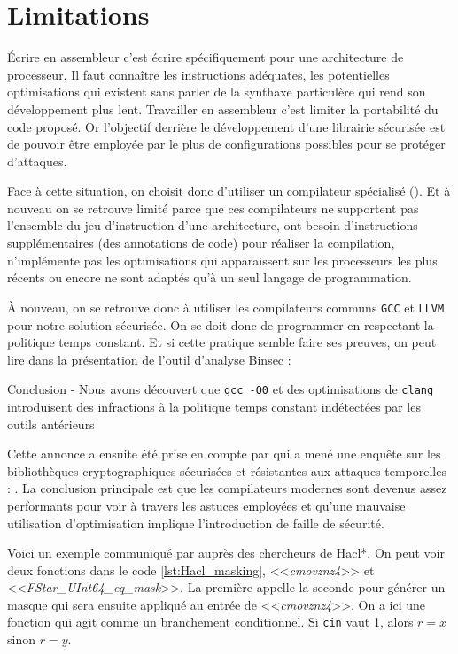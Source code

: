 \section{Limitations}
\label{sect:limitations}

Écrire en assembleur c'est écrire spécifiquement pour une architecture de processeur. Il faut connaître les instructions adéquates, les potentielles optimisations qui existent sans parler de la synthaxe particulère qui rend son développement plus lent. Travailler en assembleur c'est limiter la portabilité du code proposé. Or l'objectif derrière le développement d'une librairie sécurisée est de pouvoir être employée par le plus de configurations possibles pour se protéger d'attaques.\smallbreak

Face à cette situation, on choisit donc d'utiliser un compilateur spécialisé (\cite{Borrello_2021, Raccoon}). Et à nouveau on se retrouve limité parce que ces compilateurs ne supportent pas l'ensemble du jeu d'instruction d'une architecture, ont besoin d'instructions supplémentaires (des annotations de code) pour réaliser la compilation, n'implémente pas les optimisations qui apparaissent sur les processeurs les plus récents ou encore ne sont adaptés qu'à un seul langage de programmation.\smallbreak

À nouveau, on se retrouve donc à utiliser les compilateurs communs \texttt{GCC} et \texttt{LLVM} pour notre solution sécurisée. On se doit donc de programmer en respectant la politique temps constant. Et si cette pratique semble faire ses preuves, on peut lire dans la présentation de l'outil d'analyse Binsec  : 
\begin{CitationBox}{Conclusion - \cite{binsecRel2019}}
Nous avons découvert que \texttt{gcc -O0} et des optimisations de \texttt{clang} introduisent des infractions à la politique temps constant indétectées par les outils antérieurs
\end{CitationBox}\smallbreak

Cette annonce a ensuite été prise en compte par \citeauthor{schneider2024breakingbadcompilersbreak} qui a mené une enquête sur les bibliothèques cryptographiques sécurisées et résistantes aux attaques temporelles : \cite{schneider2024breakingbadcompilersbreak}. La conclusion principale est que les compilateurs modernes sont devenus assez performants pour voir à travers les astuces employées et qu'une mauvaise utilisation d'optimisation implique l'introduction de faille de sécurité. \smallbreak

Voici un exemple communiqué par \citeauthor{schneider2024breakingbadcompilersbreak} auprès des chercheurs de Hacl*. On peut voir deux fonctions dans le code \ref{lst:Hacl_masking}, <<\textit{cmovznz4}>> et <<\textit{FStar\_UInt64\_eq\_mask}>>. La première appelle la seconde pour générer un masque qui sera ensuite appliqué au entrée de <<\textit{cmovznz4}>>. On a ici une fonction qui agit comme un branchement conditionnel. Si \texttt{cin} vaut 1, alors $r = x$ sinon $r = y$.

